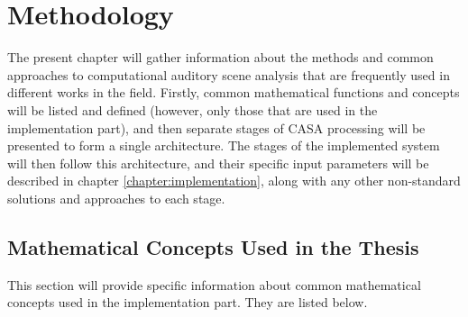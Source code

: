 \chapter{Methodology}\label{chapter:methodology}

The present chapter will gather information about the methods and common approaches to computational auditory scene analysis that are frequently used in different works in the field. Firstly, common mathematical functions and concepts will be listed and defined (however, only those that are used in the implementation part), and then separate stages of CASA processing will be presented to form a single architecture. The stages of the implemented system will then follow this architecture, and their specific input parameters will be described in chapter \ref{chapter:implementation}, along with any other non-standard solutions and approaches to each stage.

\section{Mathematical Concepts Used in the Thesis}\label{section:math_concepts}

This section will provide specific information about common mathematical concepts used in the implementation part. They are listed below.

